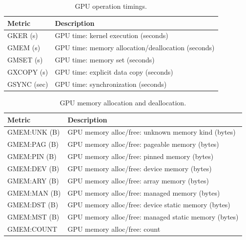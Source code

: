 \begin{table}[t]
\centering
\begin{tabular}{|l|l|}\hline
Metric & Description\\\hline\hline
 GKER (s)  &  GPU time: kernel execution (seconds)  \\\hline 
  GMEM (s)  &  GPU time: memory allocation/deallocation (seconds)  \\\hline 
  GMSET (s)  &  GPU time: memory set (seconds)  \\\hline 
  GXCOPY (s)  &  GPU time: explicit data copy (seconds)  \\\hline 
  GSYNC (sec)  &  GPU time: synchronization (seconds)  \\\hline 
\end{tabular}
\caption{GPU operation timings.}
\label{table:gtimes}
\end{table}

\begin{table}[t]
\centering
\begin{tabular}{|l|l|}\hline
Metric & Description\\\hline\hline
 GMEM:UNK (B)  &  GPU memory alloc/free: unknown memory kind (bytes)  \\\hline
  GMEM:PAG (B)  &  GPU memory alloc/free: pageable memory (bytes)  \\\hline
  GMEM:PIN (B)  &  GPU memory alloc/free: pinned memory (bytes)  \\\hline
  GMEM:DEV (B)  &  GPU memory alloc/free: device memory (bytes)  \\\hline
  GMEM:ARY (B)  &  GPU memory alloc/free: array memory (bytes)  \\\hline
  GMEM:MAN (B)  &  GPU memory alloc/free: managed memory (bytes)  \\\hline
  GMEM:DST (B)  &  GPU memory alloc/free: device static memory (bytes)  \\\hline
  GMEM:MST (B)  &  GPU memory alloc/free: managed static memory (bytes)  \\\hline
  GMEM:COUNT  &  GPU memory alloc/free: count  \\\hline
\end{tabular}
\caption{GPU memory allocation and deallocation.}
\label{table:gmem}
\end{table}


